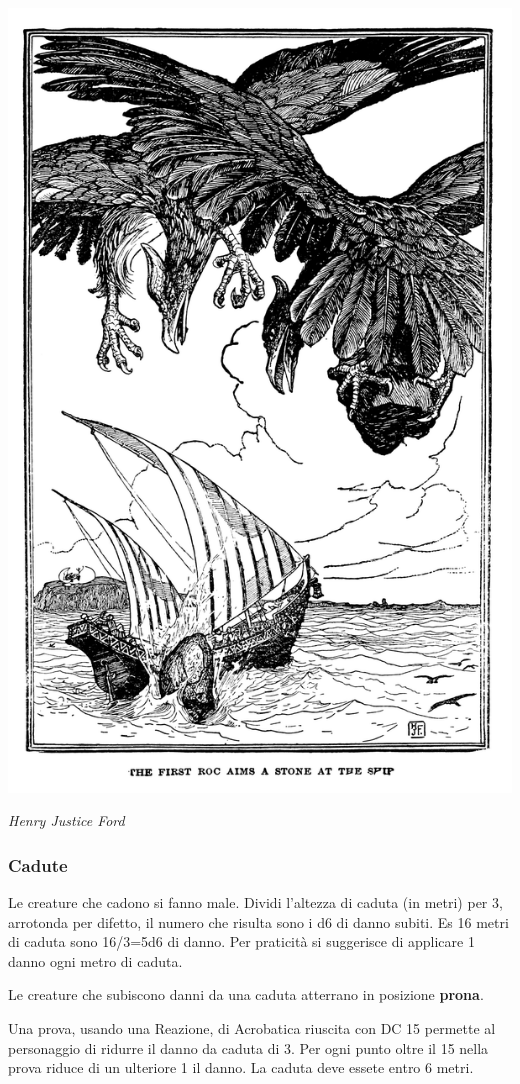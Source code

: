 \begin{multicols}{2}
\begin{center}
\includegraphics[width=0.75\linewidth]{immagini/oggetticadenti.png}

\emph{Henry Justice Ford}
\end{center}

\subsubsection{Cadute}\hypertarget{cadute}{}\label{cadute}

Le creature che cadono si fanno male. Dividi l'altezza di caduta (in metri) per 3, arrotonda per difetto, il numero che risulta sono i d6 di danno subiti. Es 16 metri di caduta sono 16/3=5d6 di danno. Per praticità si suggerisce di applicare 1 danno ogni metro di caduta.

Le creature che subiscono danni da una caduta atterrano in posizione \textbf{prona}.

Una prova, usando una Reazione, di Acrobatica riuscita con DC 15 permette al personaggio di ridurre il danno da caduta di 3. Per ogni punto oltre il 15 nella prova riduce di un ulteriore 1 il danno. La caduta deve essete entro 6 metri.


\end{multicols}
